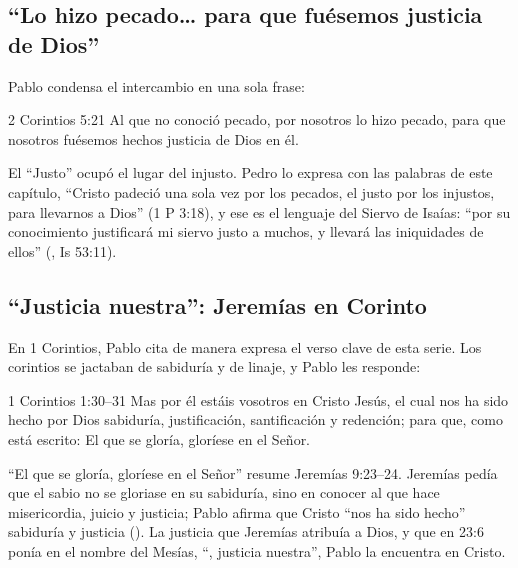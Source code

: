 \subsection{“Lo hizo pecado\ldots{} para que fuésemos justicia de Dios”}
Pablo condensa el intercambio en una sola frase:

\begin{verso}{2 Corintios 5:21}
Al que no conoció pecado, por nosotros lo hizo pecado, para que nosotros fuésemos hechos justicia de Dios en él.
\end{verso}

El ``Justo'' ocupó el lugar del injusto. Pedro lo expresa con las palabras de este capítulo, ``Cristo padeció una sola vez por los pecados, el justo por los injustos, para llevarnos a Dios'' (1 P 3:18), y ese es el lenguaje del Siervo de Isaías: ``por su conocimiento justificará mi siervo justo a muchos, y llevará las iniquidades de ellos'' (, Is 53:11).

\subsection{“Justicia nuestra”: Jeremías en Corinto}
En 1 Corintios, Pablo cita de manera expresa el verso clave de esta serie. Los corintios se jactaban de sabiduría y de linaje, y Pablo les responde:

\begin{verso}{1 Corintios 1:30–31}
Mas por él estáis vosotros en Cristo Jesús, el cual nos ha sido hecho por Dios sabiduría, justificación, santificación y redención; para que, como está escrito: El que se gloría, gloríese en el Señor.
\end{verso}

``El que se gloría, gloríese en el Señor'' resume Jeremías 9:23--24. Jeremías pedía que el sabio no se gloriase en su sabiduría, sino en conocer al \SENOR{} que hace misericordia, juicio y justicia; Pablo afirma que Cristo ``nos ha sido hecho'' sabiduría y justicia (). La justicia que Jeremías atribuía a Dios, y que en 23:6 ponía en el nombre del Mesías, ``\SENOR, justicia nuestra'', Pablo la encuentra en Cristo.


